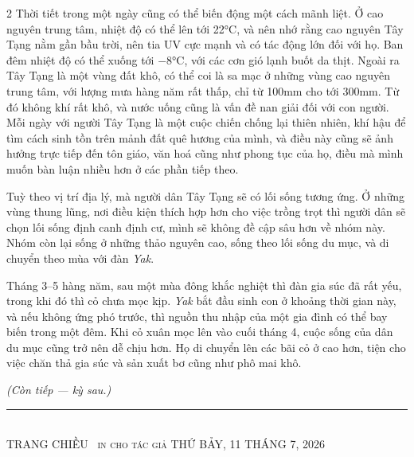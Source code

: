 \documentclass[11pt,a4paper]{article}
\newcommand{\PaperName}{TRANG CHIỀU}
\newcommand{\PaperDate}{THỨ BẢY, 11 THÁNG 7, 2026}
\newcommand{\sectionbreak}{%
  \par\vspace{8pt}{\centering *\quad*\quad*\par}\vspace{8pt}}
\begin{document}
\begin{multicols}{2}
Thời tiết trong một ngày cũng có thể biến động một cách mãnh liệt. Ở
cao nguyên trung tâm, nhiệt độ có thể lên tới 22°C, và nên nhớ rằng
cao nguyên Tây Tạng nằm gần bầu trời, nên tia UV cực mạnh và có tác
động lớn đối với họ. Ban đêm nhiệt độ có thể xuống tới $-8$°C, với
các cơn gió lạnh buốt da thịt. Ngoài ra Tây Tạng là một vùng đất khô,
có thể coi là sa mạc ở những vùng cao nguyên trung tâm, với lượng mưa
hàng năm rất thấp, chỉ từ 100mm cho tới 300mm. Từ đó không khí rất
khô, và nước uống cũng là vấn đề nan giải đối với con người. Mỗi ngày
với người Tây Tạng là một cuộc chiến chống lại thiên nhiên, khí hậu
để tìm cách sinh tồn trên mảnh đất quê hương của mình, và điều này
cũng sẽ ảnh hưởng trực tiếp đến tôn giáo, văn hoá cũng như phong tục
của họ, điều mà mình muốn bàn luận nhiều hơn ở các phần tiếp theo.

\sectionbreak

Tuỳ theo vị trí địa lý, mà người dân Tây Tạng sẽ có lối sống tương
ứng. Ở những vùng thung lũng, nơi điều kiện thích hợp hơn cho việc
trồng trọt thì người dân sẽ chọn lối sống định canh định cư, mình sẽ
không đề cập sâu hơn về nhóm này. Nhóm còn lại sống ở những thảo
nguyên cao, sống theo lối sống du mục, và di chuyển theo mùa với đàn
\emph{Yak}.

Tháng 3--5 hàng năm, sau một mùa đông khắc nghiệt thì đàn gia súc đã
rất yếu, trong khi đó thì cỏ chưa mọc kịp. \emph{Yak} bắt đầu sinh
con ở khoảng thời gian này, và nếu không ứng phó trước, thì nguồn thu
nhập của một gia đình có thể bay biến trong một đêm. Khi cỏ xuân mọc
lên vào cuối tháng 4, cuộc sống của dân du mục cũng trở nên dễ chịu
hơn. Họ di chuyển lên các bãi cỏ ở cao hơn, tiện cho việc chăn thả
gia súc và sản xuất bơ cũng như phô mai khô.

\vspace{6pt}
\begin{center}\footnotesize\itshape (Còn tiếp — kỳ sau.)\end{center}

\end{multicols}

\vfill
\begin{center}\rule{\textwidth}{0.4pt}\\[2pt]
{\footnotesize\scshape \PaperName\ \textperiodcentered{} in cho tác giả \textperiodcentered{} \PaperDate}
\end{center}
\end{document}

